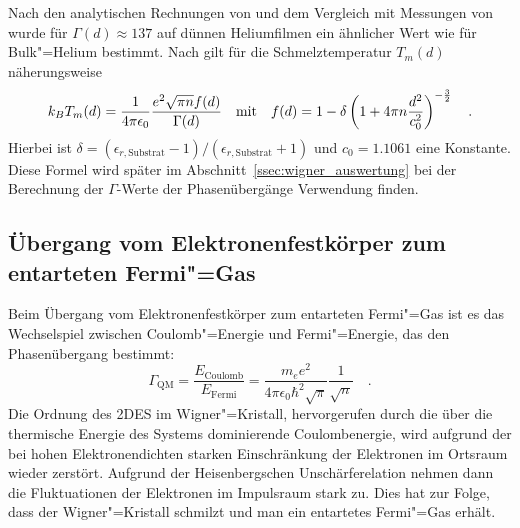 Nach den analytischen Rechnungen von  \cite{Sai89} und dem Vergleich mit Messungen von  wurde für $\Gamma(d)\approx137$ auf dünnen Heliumfilmen ein ähnlicher Wert wie für Bulk"=Helium bestimmt. Nach  gilt für die Schmelztemperatur $T_m(d)$ näherungsweise
\begin{equation}
	\label{eqn:wc_melting_temp}
	k_BT_m(d)=\frac1{4\pi\epsilon_0}\frac{e^2\sqrt{\pi n}f(d)}{\Gamma(d)}\quad\text{mit}\quad
	f(d)=1-\delta\left(1+4\pi n \frac{d^2}{c_0^2}\right)^{-\frac32}\quad.
\end{equation}
Hierbei ist $\delta=(\epsilon_{r,\text{Substrat}}-1)/(\epsilon_{r,\text{Substrat}}+1)$ und $c_0=1.1061$ eine Konstante. Diese Formel wird später im Abschnitt~\ref{ssec:wigner_auswertung} bei der Berechnung der $\Gamma$-Werte der Phasenübergänge Verwendung finden.

\subsection{Übergang vom Elektronenfestkörper zum entarteten Fermi"=Gas}
Beim Übergang vom Elektronenfestkörper zum entarteten Fermi"=Gas ist es das Wechselspiel zwischen Coulomb"=Energie und Fermi"=Energie, das den Phasenübergang bestimmt:
\begin{equation}
	\label{eqn:qm_Gamma}
	\Gamma_\text{QM}=\frac{E_\text{Coulomb}}{E_\text{Fermi}}
		=\frac{m_e e^2}{4\pi\epsilon_0\hbar^2 \sqrt{\pi}}\frac1{\sqrt{n}}\quad.
\end{equation}
Die Ordnung des 2DES im Wigner"=Kristall, hervorgerufen durch die über die thermische Energie des Systems dominierende Coulombenergie, wird aufgrund der bei hohen Elektronendichten starken Einschränkung der Elektronen im Ortsraum wieder zerstört. Aufgrund der Heisenbergschen Unschärferelation nehmen dann die Fluktuationen der Elektronen im Impulsraum stark zu. Dies hat zur Folge, dass der Wigner"=Kristall schmilzt und man ein entartetes Fermi"=Gas erhält.

